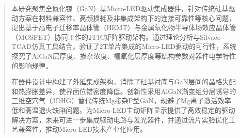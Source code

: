 \documentclass[
    oneside,                %
    fontset = win, %
  ]{njuthesis}
\begin{document}

\maketitle

\raggedbottom

\begin{abstract}

本研究聚焦全氮化镓（GaN）基Micro-LED驱动集成器件，针对传统硅基驱动方案在材料兼容性、高频损耗及非集成架构下的连接可靠性等核心问题，提出基于高电子迁移率晶体管（HEMT）与金属氧化物半导体场效应晶体管（MOSFET）协同工作的2T1C矩阵驱动架构。通过理论分析与Silvaco TCAD仿真工具结合，验证了2T单片集成的Micro-LED驱动的可行性，系统探究了AlGaN层厚度、掺杂浓度、栅氧化层厚度等结构参数对器件电学特性的影响规律。

在器件设计中构建了外延集成架构，消除了硅基衬底与GaN层间的晶格失配和热膨胀差异，使界面位错密度降低。创新性采用AlGaN渐变组分层诱导的三维空穴气（3DHG）替代传统Mg掺杂P型GaN，规避了Mg离子激活效率低和高温退火缺陷问题。为Micro-LED主动矩阵显示提供了高效稳定的驱动解决方案，未来可进一步集成驱动电路与发光器件，并通过流片实验优化工艺兼容性，推动Micro-LED技术产业化应用。

\end{abstract}
\end{document}
